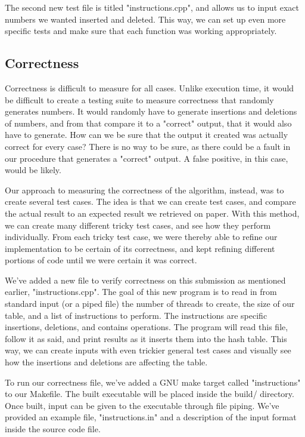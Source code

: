 \documentclass[journal]{IEEEtran}
\begin{document}
The second new test file is titled "instructions.cpp", and allows us to input exact numbers we wanted inserted and deleted. This way, we can set up even more specific tests and make sure that each function was working appropriately.


\subsection{Correctness}

Correctness is difficult to measure for all cases. Unlike execution time, it would be difficult to create a testing suite to measure correctness that randomly generates numbers. It would randomly have to generate insertions and deletions of numbers, and from that compare it to a "correct" output, that it would also have to generate. How can we be sure that the output it created was actually correct for every case? There is no way to be sure, as there could be a fault in our procedure that generates a "correct" output. A false positive, in this case, would be likely.

Our approach to measuring the correctness of the algorithm, instead, was to create several test cases. The idea is that we can create test cases, and compare the actual result to an expected result we retrieved on paper. With this method, we can create many different tricky test cases, and see how they perform individually. From each tricky test case, we were thereby able to refine our implementation to be certain of its correctness, and kept refining different portions of code until we were certain it was correct.

We've added a new file to verify correctness on this submission as mentioned earlier, "instructions.cpp". The goal of this new program is to read in from standard input (or a piped file) the number of threads to create, the size of our table, and a list of instructions to perform. The instructions are specific insertions, deletions, and contains operations. The program will read this file, follow it as said, and print results as it inserts them into the hash table. This way, we can create inputs with even trickier general test cases and visually see how the insertions and deletions are affecting the table.

To run our correctness file, we've added a GNU make target called "instructions" to our Makefile. The built executable will be placed inside the build/ directory. Once built, input can be given to the executable through file piping. We've provided an example file, "instructions.in" and a description of the input format inside the source code file.
\end{document}
